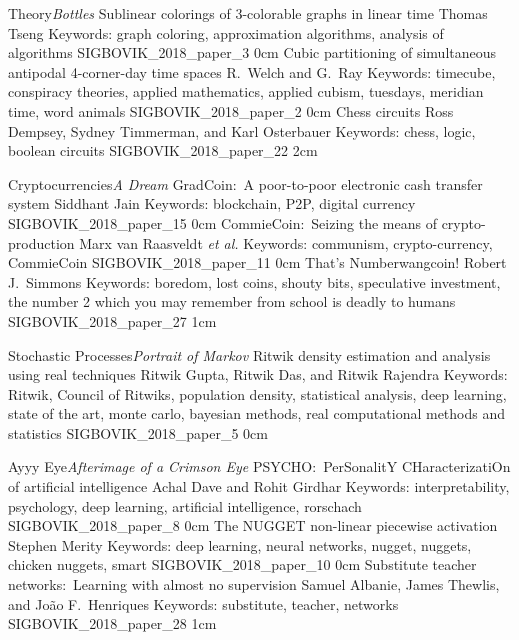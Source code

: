
\addtrack
	{Theory}{\textit{Bottles}}
\addpaper
	{Sublinear colorings of 3-colorable graphs in linear time}
	{Thomas Tseng}
	{Keywords: graph coloring, approximation algorithms, analysis of algorithms}
	{SIGBOVIK_2018_paper_3}
	{0cm}
	{}
\addpaper
	{Cubic partitioning of simultaneous antipodal 4-corner-day time spaces}
	{R.\ Welch and G.\ Ray}
	{Keywords: timecube, conspiracy theories, applied mathematics, applied cubism, tuesdays, meridian time, word animals}
	{SIGBOVIK_2018_paper_2}
	{0cm}
	{}
\addpaper
	{Chess circuits}
	{Ross Dempsey, Sydney Timmerman, and Karl Osterbauer}
	{Keywords: chess, logic, boolean circuits}
	{SIGBOVIK_2018_paper_22}
	{2cm}
	{}

\addtrack
	{Cryptocurrencies}{\textit{A Dream}}
\addpaper
	{GradCoin:\ A poor-to-poor electronic cash transfer system}
	{Siddhant Jain}
	{Keywords: blockchain, P2P, digital currency}
	{SIGBOVIK_2018_paper_15}
	{0cm}
	{}
\addpaper
	{CommieCoin:\ Seizing the means of crypto-production}
	{Marx van Raasveldt \textit{et al.}}
	{Keywords: communism, crypto-currency, CommieCoin}
	{SIGBOVIK_2018_paper_11}
	{0cm}
	{}
\addpaper
	{That's Numberwangcoin!}
	{Robert J.\ Simmons}
	{Keywords: boredom, lost coins, shouty bits, speculative investment, the number 2 which you may remember from school is deadly to humans}
	{SIGBOVIK_2018_paper_27}
	{1cm}
	{}

\addtrack
	{Stochastic Processes}{\textit{Portrait of Markov}}
\addpaper
	{Ritwik density estimation and analysis using real techniques}
	{Ritwik Gupta, Ritwik Das, and Ritwik Rajendra}
	{Keywords: Ritwik, Council of Ritwiks, population density, statistical analysis, deep learning, state of the art, monte carlo, bayesian methods, real computational methods and statistics}
	{SIGBOVIK_2018_paper_5}
	{0cm}
	{}

\addtrack
	{Ayyy Eye}{\textit{Afterimage of a Crimson Eye}}
\addpaper
	{PSYCHO:\ PerSonalitY CHaracterizatiOn of artificial intelligence}
	{Achal Dave and Rohit Girdhar}
	{Keywords: interpretability, psychology, deep learning, artificial intelligence, rorschach}
	{SIGBOVIK_2018_paper_8}
	{0cm}
	{}
\addpaper
	{The NUGGET non-linear piecewise activation}
	{Stephen Merity}
	{Keywords: deep learning, neural networks, nugget, nuggets, chicken nuggets, smart}
	{SIGBOVIK_2018_paper_10}
	{0cm}
	{}
\addpaper
	{Substitute teacher networks:\ Learning with almost no supervision}
	{Samuel Albanie, James Thewlis, and Jo\~ao F.\ Henriques}
	{Keywords: substitute, teacher, networks}
	{SIGBOVIK_2018_paper_28}
	{1cm}
	{}

